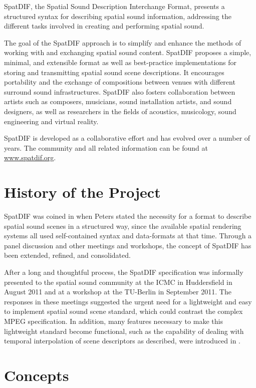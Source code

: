 \documentclass[a4paper]{article}
\begin{document}
SpatDIF, the Spatial Sound Description Interchange Format, presents a structured syntax for describing spatial sound information, addressing the different tasks involved in creating and performing spatial sound.

The goal of the SpatDIF approach is to simplify and enhance the methods of working with and exchanging spatial sound content. 
SpatDIF proposes a simple, minimal, and extensible format as well as best-practice implementations for storing and transmitting spatial sound scene descriptions. 
It encourages portability and the exchange of compositions between venues with different surround sound infrastructures. 
SpatDIF also fosters collaboration between artists such as composers, musicians, sound installation artists, and sound designers, as well as researchers in the fields of acoustics, musicology, sound engineering and virtual reality.

SpatDIF is developed as a collaborative effort and has evolved over a number of years. 
The community and all related information can be found at \url{www.spatdif.org}.

\section{History of the Project} %
SpatDIF was coined in \citeyear{peters_caa07} \cite{peters_caa07} when Peters stated the necessity for a format to describe spatial sound scenes in a structured way, since the available spatial rendering systems all used self-contained syntax and data-formats at that time. 
Through a panel discussion \cite{2008ICMCpanel, Peters:2008spatdif} and other meetings and workshops, the concept of SpatDIF has been extended, refined, and consolidated. 

After a long and thoughtful process, the SpatDIF specification was informally presented to the spatial sound community at the ICMC in Huddersfield in August 2011 and at a workshop at the TU-Berlin in September 2011.
The responses in these meetings suggested the urgent need for a lightweight and easy to implement spatial sound scene standard, which could contrast the complex MPEG specification.
In addition, many features necessary to make this lightweight standard become functional, such as the capability of dealing with temporal interpolation of scene descriptors as described, were introduced in \cite{Peters:2013SpatDifCMJ}.

\section{Concepts}
\end{document}
